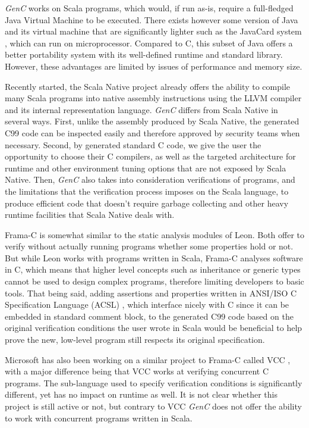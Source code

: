 \documentclass[a4paper,twoside]{article}
\newcommand{\GenC}{\emph{GenC}\xspace}
\begin{document}
\GenC works on Scala programs, which would, if run as-is, require a full-fledged
Java Virtual Machine to be executed. There exists however some version of Java
and its virtual machine that are significantly lighter such as the JavaCard
system \cite{javacard}, which can run on microprocessor. Compared to C, this
subset of Java offers a better portability system with its well-defined runtime
and standard library. However, these advantages are limited by issues of
performance and memory size.

Recently started, the Scala Native project \cite{scala_native} already offers
the ability to compile many Scala programs into native assembly instructions
using the LLVM compiler and its internal representation language. \GenC differs
from Scala Native in several ways. First, unlike the assembly produced by Scala
Native, the generated C99 code can be inspected easily and therefore approved by
security teams when necessary. Second, by generated standard C code, we give the
user the opportunity to choose their C compilers, as well as the targeted
architecture for runtime and other environment tuning options that are not
exposed by Scala Native. Then, \GenC also takes into consideration verifications
of programs, and the limitations that the verification process imposes on the
Scala language, to produce efficient code that doesn't require garbage
collecting and other heavy runtime facilities that Scala Native deals with.

Frama-C \cite{framac} is somewhat similar to the static analysis modules of
Leon. Both offer to verify without actually running programs whether some
properties hold or not. But while Leon works with programs written in Scala,
Frama-C analyses software in C, which means that higher level concepts such as
inheritance or generic types cannot be used to design complex programs,
therefore limiting developers to basic tools. That being said, adding assertions
and properties written in ANSI/ISO C Specification Language (ACSL) \cite{acsl},
which interface nicely with C since it can be embedded in standard comment
block, to the generated C99 code based on the original verification conditions
the user wrote in Scala would be beneficial to help prove the new, low-level
program still respects its original specification.

Microsoft has also been working on a similar project to Frama-C called VCC
\cite{vcc}, with a major difference being that VCC works at verifying concurrent
C programs. The sub-language used to specify verification conditions is
significantly different, yet has no impact on runtime as well. It is not clear
whether this project is still active or not, but contrary to VCC \GenC does not
offer the ability to work with concurrent programs written in Scala.
\end{document}
